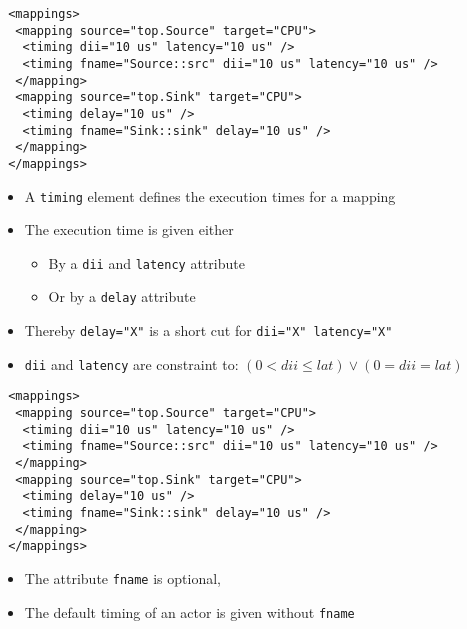 \begin{frame}[fragile=singleslide]
\begin{lstlisting}
 <mappings>
  <mapping source="top.Source" target="CPU">
   <timing dii="10 us" latency="10 us" />
   <timing fname="Source::src" dii="10 us" latency="10 us" />
  </mapping>
  <mapping source="top.Sink" target="CPU">
   <timing delay="10 us" />
   <timing fname="Sink::sink" delay="10 us" />
  </mapping>
 </mappings>
\end{lstlisting}
\begin{itemize}
\item A \lstinline!timing! element defines the execution times for a mapping
\item The execution time is given either
\begin{itemize}
\item By a \lstinline!dii! and  \lstinline!latency! attribute
\item Or by a \lstinline!delay! attribute
\end{itemize}
\item Thereby \lstinline!delay="X"! is a short cut for \lstinline!dii="X" latency="X"!
\item \lstinline!dii! and \lstinline!latency! are constraint to: $(0 < dii \le lat) \vee (0=dii=lat)$
\end{itemize}
\vfill
\end{frame}


\begin{frame}[fragile=singleslide]
\begin{lstlisting}
 <mappings>
  <mapping source="top.Source" target="CPU">
   <timing dii="10 us" latency="10 us" />
   <timing fname="Source::src" dii="10 us" latency="10 us" />
  </mapping>
  <mapping source="top.Sink" target="CPU">
   <timing delay="10 us" />
   <timing fname="Sink::sink" delay="10 us" />
  </mapping>
 </mappings>
\end{lstlisting}
\begin{itemize}
\item The attribute \lstinline!fname! is optional,
\item The default timing of an actor is given without \lstinline!fname!
\end{itemize}
\vfill
\end{frame}


